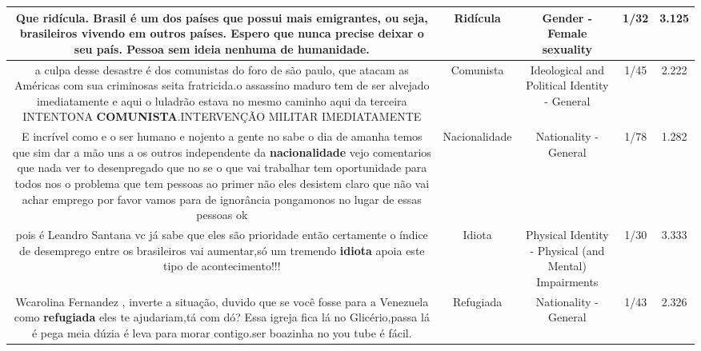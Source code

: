 \documentclass[11pt]{article}
\newlength\mylength
\begin{document}
\begin{center}
\begin{longtable}{|C{.65\mylength}|C{.30\mylength}|C{.12\mylength}|C{.12\mylength}|C{.12\mylength}|}
  \small Que \textbf{ridícula}. Brasil é um dos países que possui mais emigrantes, ou seja, brasileiros vivendo em outros países. Espero que nunca precise deixar o seu país. Pessoa sem ideia nenhuma de humanidade.\normalsize   & Ridícula & Gender - Female sexuality & 1/32 & 3.125 \\  \hline
  \small a culpa desse desastre é dos comunistas do foro de são paulo, que atacam as Américas com sua criminosas seita fratricida.o assassino maduro tem de ser alvejado imediatamente e aqui o luladrão estava no mesmo caminho aqui da terceira INTENTONA \textbf{COMUNISTA}.INTERVENÇÃO MILITAR IMEDIATAMENTE\normalsize   & Comunista & Ideological and Political Identity - General & 1/45 & 2.222 \\  \hline
  \small E incrível como e o ser humano e nojento a gente no sabe o dia de amanha temos que sim dar a mão uns a os outros independente da \textbf{nacionalidade} vejo comentarios que nada ver to desenpregado que no se o que vai trabalhar tem oportunidade para todos nos o problema que tem pessoas ao primer não eles desistem claro que não vai achar emprego por favor vamos para de ignorância pongamonos no lugar de essas pessoas ok\normalsize   & Nacionalidade & Nationality - General & 1/78 & 1.282 \\  \hline
  \small pois é Leandro Santana vc já sabe que eles são prioridade então certamente o índice de desemprego entre os brasileiros vai aumentar,só um tremendo \textbf{idiota} apoia este tipo de acontecimento!!!\normalsize   & Idiota & Physical Identity - Physical (and Mental) Impairments & 1/30 & 3.333 \\  \hline
  \small Wcarolina Fernandez , inverte a situação, duvido que se você fosse para a Venezuela  como \textbf{refugiada} eles te ajudariam,tá com dó? Essa igreja fica lá no Glicério,passa lá é pega meia dúzia é leva para morar contigo.ser boazinha no you tube é fácil.\normalsize   & Refugiada & Nationality - General & 1/43 & 2.326 \\  \hline

\end{longtable}
\end{center}
\end{document}
